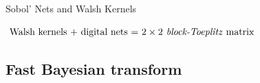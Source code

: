 \documentclass[handout, 10pt,compress,xcolor={usenames,dvipsnames}]{beamer} %
\newcommand{\bm}[1]{\boldsymbol{#1}}
\renewcommand{\mLambda}{\Lambda}
\renewcommand{\vtheta}{{\bm{\theta}}}
\newcommand{\redroundmathbox}[1]{\parbox{\widthof{$#1$\hspace{1em}}}
	{\begin{mdframed}[style=redshade]\centering $#1$ \end{mdframed}}}
\begin{document}
\begin{frame}{Sobol' Nets and Walsh Kernels}
	

	\centering\redroundmathbox{\text{
			Walsh kernels + digital nets = \emph{$2\times 2$ block-Toeplitz} matrix
	}}
	
\end{frame}




\subsection{Fast Bayesian transform}

\end{document}
